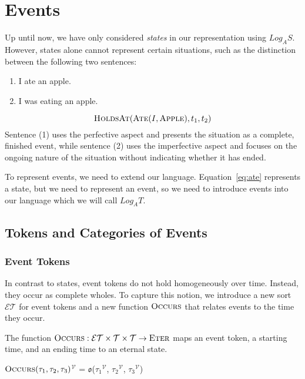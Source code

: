 \chapter{Events}

Up until now, we have only considered \textit{states} in our representation using $Log_A S$. However, states alone cannot represent certain situations, such as the distinction between the following two sentences:

\begin{enumerate}[label=(\arabic*)]
    \item I ate an apple.
    \item I was eating an apple.
\end{enumerate}

\begin{equation}
    \textsc{HoldsAt}(\textsc{Ate}(I, \textsc{Apple}), t_1, t_2)
    \label{eq:ate}
\end{equation}
Sentence (1) uses the perfective aspect and presents the situation as a complete, finished event, while sentence (2) uses the imperfective aspect and focuses on the ongoing nature of the situation without indicating whether it has ended.

To represent events, we need to extend our language. Equation~\ref{eq:ate} represents a state, but we need to represent an event, so we need to introduce events into our language
which we will call $Log_A T$.

\section{Tokens and Categories of Events}
\subsection{Event Tokens}

In contrast to states, event tokens do not hold homogeneously over time.
Instead, they occur as complete wholes.
To capture this notion, we introduce a new sort $\mathcal{ET}$ for event tokens and a new function $\textsc{Occurs}$ that relates events to the time they occur.

\begin{defn}
    The function $\textsc{Occurs}: \mathcal{ET} \times \mathcal{T} \times \mathcal{T} \to \textsc{Eter}$ maps an event token,
    a starting time, and an ending time to an eternal state.
\end{defn}

\begin{defn}
    \textlbrackdbl $\textsc{Occurs}(\tau_1, \tau_2, \tau_3)$\textrbrackdbl$^{\mathcal{V}}$ = $\mathfrak{o}$(\textlbrackdbl $\tau_1$\textrbrackdbl$^{\mathcal{V}}$, \textlbrackdbl $\tau_2$\textrbrackdbl$^{\mathcal{V}}$, \textlbrackdbl$\tau_3$\textrbrackdbl$^{\mathcal{V}}$)
\end{defn}

